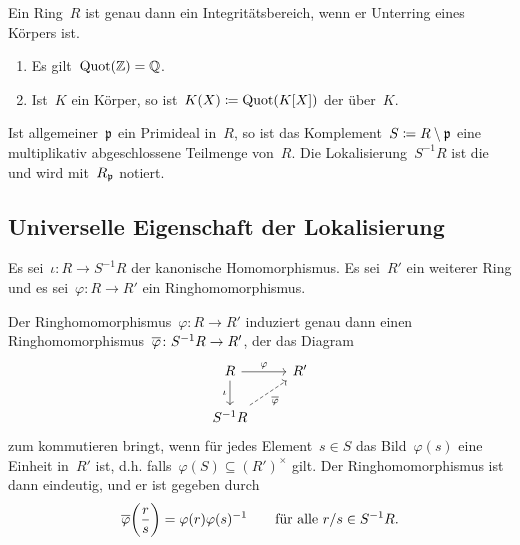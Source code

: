 \begin{corollary}
  Ein Ring~$R$ ist genau dann ein Integritätsbereich, wenn er Unterring eines Körpers ist.
\end{corollary}

\begin{example}
  \leavevmode
  \begin{enumerate}
    \item
      Es gilt~$\operatorname{Quot}(\mathbb{Z}) = \mathbb{Q}$.
    \item
      Ist~$K$ ein Körper, so ist~$K(X) \coloneqq \operatorname{Quot}(K[X])$ der  über~$K$.
  \end{enumerate}
\end{example}

\begin{example}
  Ist allgemeiner~$\mathfrak{p}$ ein Primideal in~$R$, so ist das Komplement~$S \coloneqq R \setminus \mathfrak{p}$ eine multiplikativ abgeschlossene Teilmenge von~$R$.
  Die Lokalisierung~$S^{-1} R$ ist die  und wird mit~$R_{\mathfrak{p}}$ notiert.
\end{example}




\subsection{Universelle Eigenschaft der Lokalisierung}

\begin{theorem}
  Es sei~$\iota \colon R \to S^{-1} R$ der kanonische Homomorphismus.
  Es sei~$R'$ ein weiterer Ring und es sei~$\varphi \colon R \to R'$ ein Ringhomomorphismus.

  Der Ringhomomorphismus~$\varphi \colon R \to R'$ induziert genau dann einen Ringhomomorphismus~$\induced{\varphi} \colon S^{-1} R \to R'$, der das Diagram
  \[
    \begin{tikzcd}
      R
      \arrow{r}[above]{\varphi}
      \arrow{d}[left]{\iota}
      &
      R'
      \\
      S^{-1} R
      \arrow[dashed]{ur}[below right]{\induced{\varphi}}
      &
      {}
    \end{tikzcd}
  \]
  zum kommutieren bringt, wenn für jedes Element~$s \in S$ das Bild~$\varphi(s)$ eine Einheit in~$R'$ ist, d.h. falls~$\varphi(S) \subseteq (R')^\times$ gilt.
  Der Ringhomomorphismus ist dann eindeutig, und er ist gegeben durch
  \[
    \overline{\varphi}\biggl( \frac{r}{s} \biggr)
    =
    \varphi(r) \varphi(s)^{-1}
    \qquad
    \text{für alle~$r/s \in S^{-1} R$.}
  \]
\end{theorem}

